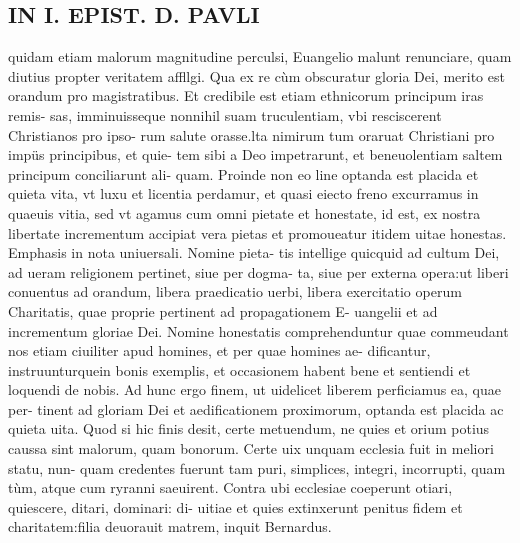 \documentclass{article}
\begin{document}
\begin{pages}
\section*{IN I. EPIST. D. PAVLI }
\marginpar{[ p.66 ]}\pstart quidam etiam malorum magnitudine perculsi, Euangelio malunt renunciare, quam diutius propter veritatem affllgi. Qua ex re cùm obscuratur gloria Dei, merito est orandum pro magistratibus. Et credibile est etiam ethnicorum principum iras remis- sas, imminuisseque  nonnihil suam truculentiam, vbi resciscerent Christianos pro ipso- rum salute orasse.lta nimirum tum oraruat Christiani pro impüs principibus, et quie- tem sibi a Deo impetrarunt, et beneuolentiam saltem principum conciliarunt ali- quam. Proinde non eo line optanda est placida et quieta vita, vt luxu et licentia perdamur, et quasi eiecto freno excurramus in quaeuis vitia, sed vt agamus cum omni pietate et honestate, id est, ex nostra libertate incrementum accipiat vera pietas et promoueatur itidem uitae honestas. Emphasis in nota uniuersali. Nomine pieta- tis intellige quicquid ad cultum Dei, ad ueram religionem pertinet, siue per dogma- ta, siue per externa opera:ut liberi conuentus ad orandum, libera praedicatio uerbi, libera exercitatio operum Charitatis, quae proprie pertinent ad propagationem E- uangelii et ad incrementum gloriae Dei. Nomine honestatis comprehenduntur quae commeudant nos etiam ciuiliter apud homines, et per quae homines ae- dificantur, instruunturquein bonis exemplis, et occasionem habent bene et sentiendi et loquendi de nobis. Ad hunc ergo finem, ut uidelicet liberem perficiamus ea, quae per- tinent ad gloriam Dei et aedificationem proximorum, optanda est placida ac quieta uita. Quod si hic finis desit, certe metuendum, ne quies et orium potius caussa sint malorum, quam bonorum. Certe uix unquam ecclesia fuit in meliori statu, nun- quam credentes fuerunt tam puri, simplices, integri, incorrupti, quam tùm, atque  cum ryranni saeuirent. Contra ubi ecclesiae coeperunt otiari, quiescere, ditari, dominari: di- uitiae et quies extinxerunt penitus fidem et charitatem:filia deuorauit matrem, inquit Bernardus.  \pend
{}
{}

\end{pages}
\end{document}
